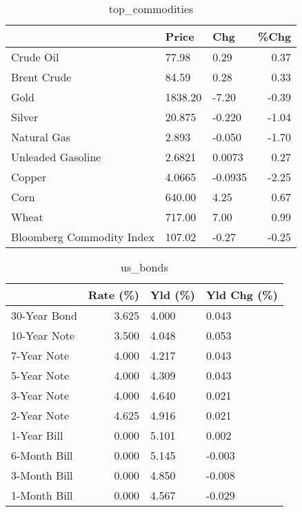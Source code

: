 \documentclass{article}%
\begin{document}
\begin{table}[htbp]%
\caption{top\_commodities}%
\centering%
\begin{adjustbox}{width=1\textwidth}%
\begin{tabular}{lllr}
\toprule
                          &   Price &     Chg &  \%Chg \\
\midrule
               Crude Oil  &   77.98 &    0.29 &  0.37 \\
             Brent Crude  &   84.59 &    0.28 &  0.33 \\
                    Gold  & 1838.20 &   -7.20 & -0.39 \\
                  Silver  &  20.875 &  -0.220 & -1.04 \\
             Natural Gas  &   2.893 &  -0.050 & -1.70 \\
       Unleaded Gasoline  &  2.6821 &  0.0073 &  0.27 \\
                  Copper  &  4.0665 & -0.0935 & -2.25 \\
                    Corn  &  640.00 &    4.25 &  0.67 \\
                   Wheat  &  717.00 &    7.00 &  0.99 \\
Bloomberg Commodity Index &  107.02 &   -0.27 & -0.25 \\
\bottomrule
\end{tabular}
%
\end{adjustbox}%
\end{table}

%


\begin{table}[htbp]%
\caption{us\_bonds}%
\centering%
\begin{adjustbox}{width=1\textwidth}%
\begin{tabular}{lrll}
\toprule
             &  Rate (\%) & Yld (\%) & Yld Chg (\%) \\
\midrule
30-Year Bond &     3.625 &   4.000 &       0.043 \\
10-Year Note &     3.500 &   4.048 &       0.053 \\
 7-Year Note &     4.000 &   4.217 &       0.043 \\
 5-Year Note &     4.000 &   4.309 &       0.043 \\
 3-Year Note &     4.000 &   4.640 &       0.021 \\
 2-Year Note &     4.625 &   4.916 &       0.021 \\
 1-Year Bill &     0.000 &   5.101 &       0.002 \\
6-Month Bill &     0.000 &   5.145 &      -0.003 \\
3-Month Bill &     0.000 &   4.850 &      -0.008 \\
1-Month Bill &     0.000 &   4.567 &      -0.029 \\
\bottomrule
\end{tabular}
%
\end{adjustbox}%
\end{table}
\end{document}
